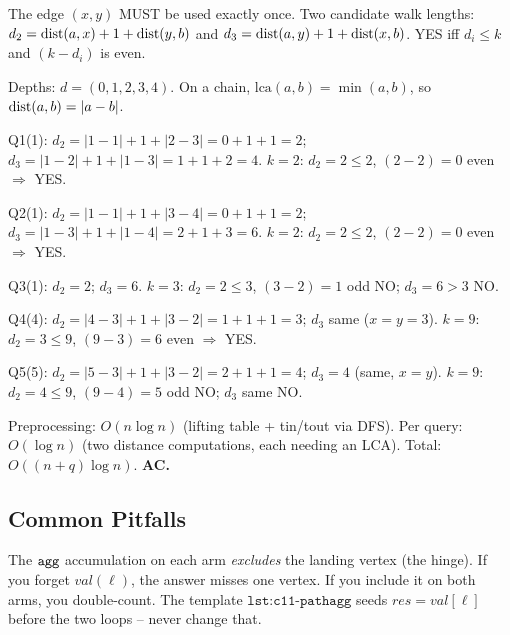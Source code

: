 \begin{tracebox}
The edge \((x,y)\) MUST be used exactly once.  Two candidate walk lengths:
\(d_2 = \operatorname{dist}(a,x)+1+\operatorname{dist}(y,b)\) and \(d_3 = \operatorname{dist}(a,y)+1+\operatorname{dist}(x,b)\).
YES iff \(d_i \le k\) and \((k - d_i)\) is even.

Depths: \(d = (0,1,2,3,4)\).  On a chain, \(\text{lca}(a,b) = \min(a,b)\),
so \(\operatorname{dist}(a,b) = |a-b|\).

Q1\;(1): \(d_2=|1{-}1|+1+|2{-}3|=0{+}1{+}1=2\);
\(d_3=|1{-}2|+1+|1{-}3|=1{+}1{+}2=4\).
\(k{=}2\): \(d_2{=}2\le 2\), \((2{-}2){=}0\) even \(\Rightarrow\) YES. \checkmark

Q2\;(1): \(d_2=|1{-}1|{+}1{+}|3{-}4|=0{+}1{+}1=2\);
\(d_3=|1{-}3|{+}1{+}|1{-}4|=2{+}1{+}3=6\).
\(k{=}2\): \(d_2{=}2\le 2\), \((2{-}2){=}0\) even \(\Rightarrow\) YES. \checkmark

Q3\;(1): \(d_2=2\); \(d_3=6\).
\(k{=}3\): \(d_2{=}2\le 3\), \((3{-}2){=}1\) odd NO; \(d_3{=}6>3\) NO. \checkmark

Q4\;(4): \(d_2=|4{-}3|{+}1{+}|3{-}2|=1{+}1{+}1=3\);
\(d_3\) same (\(x{=}y{=}3\)).
\(k{=}9\): \(d_2{=}3\le 9\), \((9{-}3){=}6\) even \(\Rightarrow\) YES. \checkmark

Q5\;(5): \(d_2=|5{-}3|{+}1{+}|3{-}2|=2{+}1{+}1=4\);
\(d_3=4\) (same, \(x{=}y\)).
\(k{=}9\): \(d_2{=}4\le 9\), \((9{-}4){=}5\) odd NO; \(d_3\) same NO. \checkmark
\end{tracebox}

\begin{complexitybox}
Preprocessing: \(O(n \log n)\) (lifting table + tin/tout via DFS).
Per query: \(O(\log n)\) (two distance computations, each needing an LCA).
Total: \(O((n+q)\log n)\).  \textbf{AC.}
\end{complexitybox}

\subsection{Common Pitfalls}

\begin{warningbox}
The \(\texttt{agg}\) accumulation on each arm \emph{excludes} the landing
vertex (the hinge).  If you forget \(\mathit{val}(\ell)\), the answer
misses one vertex.  If you include it on both arms, you double-count.
The template \(\texttt{lst:c11-pathagg}\) seeds \(\mathit{res} =
\mathit{val}[\ell]\) before the two loops -- never change that.
\end{warningbox}

